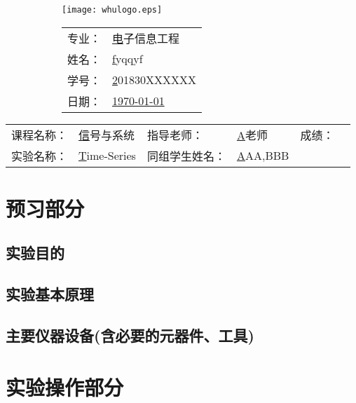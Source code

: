 \documentclass{whureport}
\newcommand{\major}{电子信息工程}
\newcommand{\name}{fyqqyf}
\newcommand{\stuid}{201830XXXXXX}
\newcommand{\newdate}{\today}
\newcommand{\loc}{None}
\newcommand{\course}{信号与系统}
\newcommand{\tutor}{A老师}
\newcommand{\grades}{~~~~~~~}
\newcommand{\newtitle}{Time-Series}
\newcommand{\group}{AAA,BBB}
\begin{document}
\thispagestyle{empty}
\begin{figure}[h]
  \begin{subfigure}{0.4\linewidth}
    \centerline{\texttt{[image: whulogo.eps]}}
  \end{subfigure}
  \hfill
  \begin{subfigure}{.5\linewidth}
    \raggedleft
    \begin{tabular*}{.8\linewidth}{ll}
      专业： & \underline\major   \\
      姓名： & \underline\name    \\
      学号： & \underline\stuid   \\
      日期： & \underline\newdate \\
    \end{tabular*}
  \end{subfigure}
\end{figure}

\begin{table}[!htbp]
  \centering
  \begin{tabular*}{0.7\linewidth}{llllll}
    课程名称： & \underline\course   & 指导老师： & \underline\tutor   & 成绩：       &  \underline\grades \\
    实验名称： & \underline\newtitle & 同组学生姓名：& \underline\group
  \end{tabular*}
\end{table}


\section{预习部分}
\subsection{实验目的}

\subsection{实验基本原理}

\subsection{主要仪器设备(含必要的元器件、工具)}

\section{实验操作部分}
\end{document}
